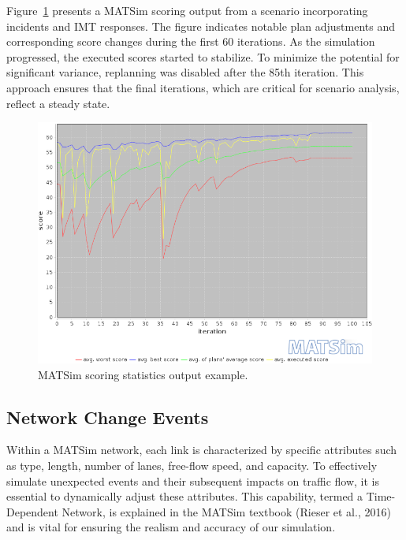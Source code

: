 \documentclass[fancy, oneside, mastersfancy, ms]{byuthesis}
\begin{document}
Figure~\ref{fig-score-output} presents a MATSim scoring output from a
scenario incorporating incidents and IMT responses. The figure indicates
notable plan adjustments and corresponding score changes during the
first 60 iterations. As the simulation progressed, the executed scores
started to stabilize. To minimize the potential for significant
variance, replanning was disabled after the 85th iteration. This
approach ensures that the final iterations, which are critical for
scenario analysis, reflect a steady state.

\begin{figure}

{\centering \includegraphics{figures/scorestats.png}

}

\caption{\label{fig-score-output}MATSim scoring statistics output
example.}

\end{figure}

\hypertarget{sec-NCE}{%
\subsection{Network Change Events}\label{sec-NCE}}

Within a MATSim network, each link is characterized by specific
attributes such as type, length, number of lanes, free-flow speed, and
capacity. To effectively simulate unexpected events and their subsequent
impacts on traffic flow, it is essential to dynamically adjust these
attributes. This capability, termed a Time-Dependent Network, is
explained in the MATSim textbook (Rieser et al., 2016) and is vital for
ensuring the realism and accuracy of our simulation.
\end{document}
